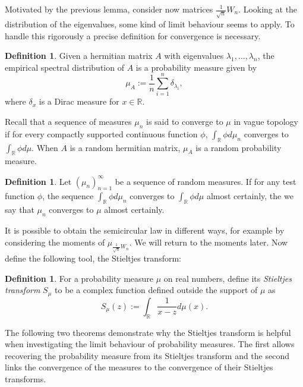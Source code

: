 \documentclass[12pt,a4paper,leqno]{report}
\newcommand{\R}{\mathbb{R}}
\theoremstyle{plain}
\theoremstyle{definition}
\newtheorem{defi}[equation]{Definition}
\theoremstyle{remark}
\begin{document}
Motivated by the previous lemma, consider now matrices $\frac{1}{\sqrt{n}}W_n$. Looking at the distribution of the eigenvalues, some kind of limit behaviour seems to apply. To handle this rigorously a precise definition for convergence is necessary.

\begin{defi}
Given a hermitian matrix $A$ with eigenvalues $\lambda_1, \ldots , \lambda_n$, the empirical spectral distribution of $A$ is a probability measure given by
\begin{equation*}
\mu_A := \frac{1}{n} \sum_{i=1}^n \delta_{\lambda_i},
\end{equation*}
where $\delta_x$ is a Dirac measure for $x \in \R$.
\end{defi}

Recall that a sequence of measures $\mu_n$ is said to converge to $\mu$ in vague topology if for every compactly supported continuous function $\phi$, $\int_{\R} \phi d\mu_n$ converges to $\int_{\R}\phi d\mu$. When $A$ is a random hermitian matrix, $\mu_A$ is a random probability measure.

\begin{defi}
Let $(\mu_n)_{n=1}^{\infty}$ be a sequence of random measures.
If for any test function $\phi$, the sequence $\int_{\R} \phi d\mu_n$ converges to $\int_{\R} \phi d\mu$ almost certainly, the we say that $\mu_n$ converges to $\mu$ almost certainly.
\end{defi}

It is possible to obtain the semicircular law in different ways, for example by considering the moments of $\mu_{\frac{1}{\sqrt{n}}W_n}$. We will return to the moments later. Now define the following tool, the Stieltjes transform:

\begin{defi}
For a probability measure $\mu$ on real numbers, define its \emph{Stieltjes transform} $S_{\mu}$ to be a complex function defined outside the support of $\mu$ as
\begin{equation*}
S_{\mu} (z) := \int_{\R} \frac{1}{x-z} d \mu(x).
\end{equation*}
\end{defi}

The following two theorems demonstrate why the Stieltjes transform is helpful when investigating the limit behaviour of probability measures. The first allows recovering the probability measure from its Stieltjes transform and the second links the convergence of the measures to the convergence of their Stieltjes transforms.
\end{document}
